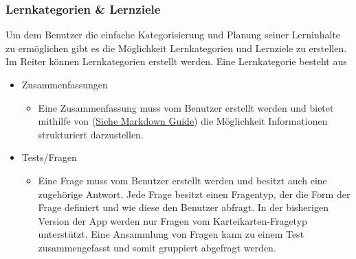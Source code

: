 \subsubsection{Lernkategorien \& Lernziele}
Um dem Benutzer die einfache Kategorisierung und Planung seiner Lerninhalte zu ermöglichen gibt es die Möglichkeit Lernkategorien und Lernziele zu erstellen. \newline
Im Reiter  können Lernkategorien erstellt werden. Eine Lernkategorie besteht aus
\begin{itemize}
  \item Zusammenfassungen
  \begin{itemize}
    \item Eine Zusammenfassung muss vom Benutzer erstellt werden und bietet mithilfe von  (\href{https://www.markdownguide.org/basic-syntax}{Siehe Markdown Guide}) die Möglichkeit Informationen strukturiert darzustellen.
  \end{itemize}
  \item Tests/Fragen
  \begin{itemize}
    \item Eine Frage muss vom Benutzer erstellt werden und besitzt auch eine zugehörige Antwort. Jede Frage besitzt einen Fragentyp, der die Form der Frage definiert und wie diese den Benutzer abfragt. In der bisherigen Version der App werden nur Fragen vom Karteikarten-Fragetyp unterstützt. Eine Ansammlung von Fragen kann zu einem Test zusammengefasst und somit gruppiert abgefragt werden.
  \end{itemize}
\end{itemize}
